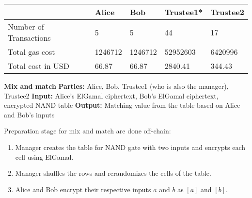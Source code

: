 \begin{table}[]
	\begin{tabular}{|l|l|l|l|l|}
		\hline
		& Alice &  Bob & Trustee1*  & Trustee2  \\ \hline
		Number of Transactions	& 5 &5  &44  &17  \\ \hline
		Total gas cost	& 1246712 &  1246712& 52952603  & 6420996 \\ \hline
		Total cost in USD	&  66.87& 66.87 &2840.41  & 344.43 \\ \hline
	\end{tabular}
\end{table}


\begin{mdframed}
 	\textbf{Mix and match}
 	\newline
 	 \newline
 	\textbf{Parties: } Alice, Bob, Trustee1 (who is also the manager), Trustee2 
 	 \newline
 	\textbf{Input: } Alice's ElGamal ciphertext, Bob's ElGamal ciphertext, encrypted NAND table 
 	\newline
 	\textbf{Output: } Matching value from the table based on Alice and Bob's inputs
 	\newline
 	
	Preparation stage for mix and match are done off-chain:
	\begin{enumerate}
		\item Manager creates the table for NAND gate with two inputs and encrypts each cell using ElGamal. 
		\item Manager shuffles the rows and rerandomizes the cells of the table.
		\item Alice and Bob encrypt their respective inputs $a$ and $b$ as $[a]$ and $[b]$.
	\end{enumerate}


\end{mdframed}
